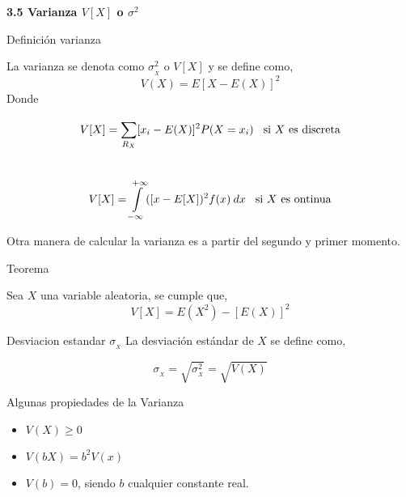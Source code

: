 \documentclass[base=hide,12pt]{elegantbook}
\begin{document}
\vspace{1cm} 
\textcolor{col4}{\large \bf 3.5 Varianza \hspace{.5cm}$V[X]$ \hspace{.5cm}o\hspace{.5cm} $\sigma^{2}$}\\

\begin{Box4}{Definición varianza}

La varianza se denota como $\sigma^{2}_{_{X}}$ o $V[X]$ y se define como,
\[V(X)=E\left[X-E\left(X\right) \right]^{2}\]
Donde
\begin{small}
	\begin{equation*}
		V[X] = 	\sum\limits_{ R_X}^{}[x_{i}-E(X)]^{2} P(X=x_{i}) \hspace{.3cm}\mbox{si $X$ es discreta}
	\end{equation*}
	\\    
	\begin{equation*}  
		V[X] = \int\limits_{-\infty}^{+\infty}([x-E[X])^{2}f(x)\:dx \hspace{.3cm} \mbox{si $X$ es ontinua}\\    
	\end{equation*}
\end{small}
\end{Box4}

Otra manera de calcular la varianza es a partir del segundo y primer momento. 

\begin{Box2}{Teorema}

Sea $X$ una variable aleatoria, se cumple que,
\[V[X]=E(X^{2})-[E(X)]^{2}\]
\end{Box2}

\begin{Box4}{Desviacion estandar $\sigma_{_{X}}$}
La desviación estándar de $X$ se define como,

$$\sigma_{_{X}}=\sqrt{\sigma^{2}_{_{X}}} = \sqrt{V(X)}$$
\end{Box4}

\begin{Box2}{Algunas propiedades de la Varianza}
\begin{itemize}
	\item $V(X)\geq 0$
	\item $V(bX)=b^{2}V(x)$
	\item $V(b)=0$, siendo $b$ cualquier constante real.
\end{itemize}
\end{Box2}
\end{document}
